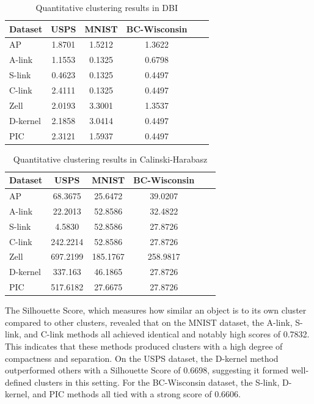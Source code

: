 \documentclass[
	10pt,
	parskip=half-,	
	paper=a4,
	english
	]{scrartcl}
\begin{document}
\begin{table}[h]
    \centering
    \caption{Quantitative clustering results in DBI}
    \begin{tabular}{lccccc}
    \toprule
    \textbf{Dataset} & \textbf{USPS} & \textbf{MNIST} & \textbf{BC-Wisconsin} \\
    \midrule
    AP       & 1.8701   & 1.5212 & 1.3622 \\
    A-link   & 1.1553  & 0.1325 & 0.6798 \\
    S-link   & 0.4623   & 0.1325 & 0.4497 \\
    C-link   & 2.4111   & 0.1325 & 0.4497 \\
    Zell     & 2.0193   & 3.3001 & 1.3537 \\
    D-kernel & 2.1858   & 3.0414 & 0.4497 \\
    PIC     & 2.3121    & 1.5937 & 0.4497 \\
    \bottomrule
    \end{tabular}
\end{table}

\begin{table}[h]
    \centering
    \caption{Quantitative clustering results in Calinski-Harabasz}
    \begin{tabular}{lccccc}
    \toprule
    \textbf{Dataset} & \textbf{USPS} & \textbf{MNIST} & \textbf{BC-Wisconsin} \\
    \midrule
    AP       & 68.3675   & 25.6472 & 39.0207 \\
    A-link   & 22.2013  & 52.8586 & 32.4822   \\
    S-link   & 4.5830   & 52.8586 & 27.8726 \\
    C-link   & 242.2214   & 52.8586 & 27.8726 \\
    Zell     & 697.2199   & 185.1767 & 258.9817 \\
    D-kernel & 337.163   & 46.1865 & 27.8726 \\
    PIC      & 517.6182 & 27.6675 & 27.8726 \\
    \bottomrule
    \end{tabular}
\end{table}

The Silhouette Score, which measures how similar an object is to its own cluster compared to other clusters, revealed that on the MNIST dataset, the A-link, S-link, and C-link methods all achieved identical and notably high scores of 0.7832. This indicates that these methods produced clusters with a high degree of compactness and separation. On the USPS dataset, the D-kernel method outperformed others with a Silhouette Score of 0.6698, suggesting it formed well-defined clusters in this setting. For the BC-Wisconsin dataset, the S-link, D-kernel, and PIC methods all tied with a strong score of 0.6606.
\end{document}
